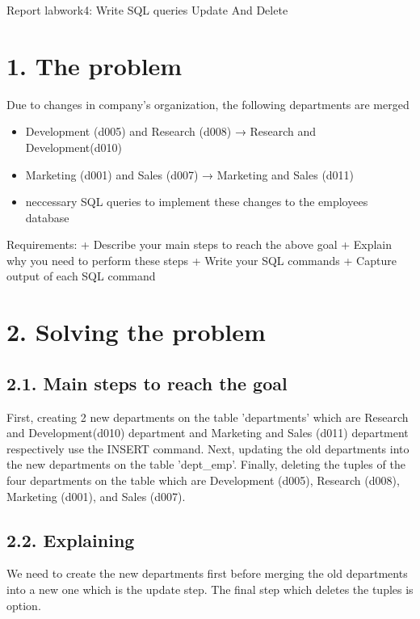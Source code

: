 \documentclass{report}
\begin{document}
\begin{center}
Report labwork4: Write SQL queries Update And Delete
\end{center}
\section*{1. The problem}
Due to changes in company’s organization, the following departments are merged
\begin{itemize}
	\item Development (d005) and Research (d008) → Research and Development(d010)
	\item Marketing (d001) and Sales (d007) → Marketing and Sales (d011)
	\item neccessary SQL queries to implement these changes to the employees database
\end{itemize}
Requirements:
+ Describe your main steps to reach the above goal
+ Explain why you need to perform these steps
+ Write your SQL commands
+ Capture output of each SQL command


\section*{2. Solving the problem}
\subsection*{2.1. Main steps to reach the goal}

\indent First, creating 2 new departments on the table 'departments' which are Research and Development(d010) department and Marketing and Sales (d011) department respectively use the INSERT command.
\indent Next, updating the old departments into the new departments on the table 'dept_emp'.
\indent Finally, deleting the tuples of the four departments on the table which are Development (d005), Research (d008), Marketing (d001), and Sales (d007).

\subsection*{2.2. Explaining}
\indent We need to create the new departments first before merging the old departments into a new one which is the update step. The final step which deletes the tuples is option.
\end{document}
